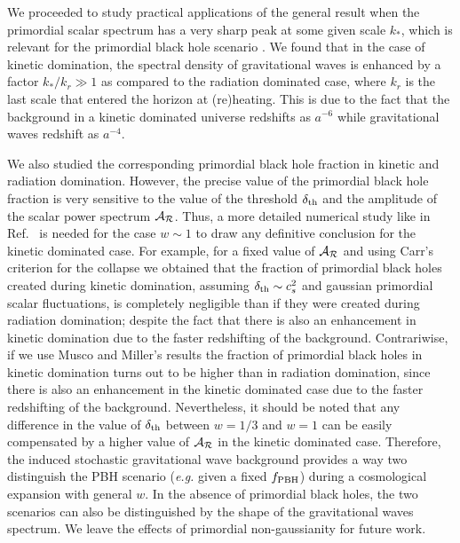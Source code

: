 \documentclass[aps,10pt,prd,groupedaddress,nofootinbib,notitlepage,eqsecnum,preprintnumbers]{revtex4-1}
\begin{document}
We proceeded to study practical applications of the general result when the primordial scalar spectrum has a very sharp peak at some given scale $k_*$, which is relevant for the primordial black hole scenario \cite{Sasaki:2018dmp}. We found that in the case of kinetic domination, the spectral density of gravitational waves is enhanced by a factor $k_*/k_r\gg1$ as compared to the radiation dominated case, where $k_r$ is the last scale that entered the horizon at (re)heating. This is due to the fact that the background in a kinetic dominated universe redshifts as $a^{-6}$ while gravitational waves redshift as $a^{-4}$. 

We also studied the corresponding primordial black hole fraction in kinetic and radiation domination. However, the precise value of the primordial black hole fraction is very sensitive to the value of the threshold $\delta_{\rm th}$ and the amplitude of the scalar power spectrum ${\cal A}_{\cal R}$. Thus, a more detailed numerical study like in Ref.~\cite{Escriva:2019nsa} is needed for the case $w\sim 1$ to draw any definitive conclusion for the kinetic dominated case. For example, for a fixed value of ${\cal A}_{\cal R}$ and using Carr's criterion \cite{Sasaki:2018dmp} for the collapse we obtained that the fraction of primordial black holes created during kinetic domination, assuming $\delta_{\rm th}\sim c_s^2$ and gaussian primordial scalar fluctuations, is completely negligible than if they were created during radiation domination; despite the fact that there is also an enhancement in kinetic domination due to the faster redshifting of the background. Contrariwise, if we use Musco and Miller's results \cite{Musco:2012au} the fraction of primordial black holes in kinetic domination turns out to be higher than in radiation domination, since there is also an enhancement in the kinetic dominated case due to the faster redshifting of the background. Nevertheless, it should be noted that any difference in the value of $\delta_{\rm th}$ between $w=1/3$ and $w=1$ can be easily compensated by a higher value of ${\cal A}_{\cal R}$ in the kinetic dominated case. Therefore, the induced stochastic gravitational wave background provides a way two distinguish the PBH scenario (\textit{e.g.} given a fixed $f_{\rm PBH}$) during a cosmological expansion with general $w$. In the absence of primordial black holes, the two scenarios can also be distinguished by the shape of the gravitational waves spectrum. We leave the effects of primordial non-gaussianity for future work. 

\end{document}
